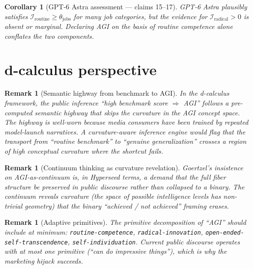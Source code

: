 \documentclass[11pt,a4paper]{article}
\newtheorem{corollary}[definition]{Corollary}
\newtheorem{remark}[definition]{Remark}
\begin{document}
\begin{corollary}[GPT-6 Astra assessment --- claims 15--17]
GPT-6 Astra plausibly satisfies $\mathcal{I}_{\text{routine}} \geq \theta_{\text{jobs}}$
for many job categories, but the evidence for
$\mathcal{I}_{\text{radical}} > 0$ is absent or marginal. Declaring AGI
on the basis of routine competence alone conflates the two components.
\end{corollary}

\section{d-calculus perspective}
\label{sec:d-calc}

\begin{remark}[Semantic highway from benchmark to AGI]
In the d-calculus framework, the public inference ``high benchmark score
$\Rightarrow$ AGI'' follows a pre-computed semantic highway that skips the
curvature in the AGI concept space. The highway is well-worn because media
consumers have been trained by repeated model-launch narratives. A
curvature-aware inference engine would flag that the transport from
``routine benchmark'' to ``genuine generalization'' crosses a region of
high conceptual curvature where the shortcut fails.
\end{remark}

\begin{remark}[Continuum thinking as curvature revelation]
Goertzel's insistence on AGI-as-continuum is, in Hyperseed terms, a demand
that the full fiber structure be preserved in public discourse rather than
collapsed to a binary. The continuum reveals curvature (the space of possible
intelligence levels has non-trivial geometry) that the binary ``achieved /
not achieved'' framing erases.
\end{remark}

\begin{remark}[Adaptive primitives]
The primitive decomposition of ``AGI'' should include at minimum:
\texttt{routine-competence}, \texttt{radical-innovation},
\texttt{open-ended-self-transcendence}, \texttt{self-individuation}.
Current public discourse operates with at most one primitive
(``can do impressive things''), which is why the marketing hijack succeeds.
\end{remark}
\end{document}
